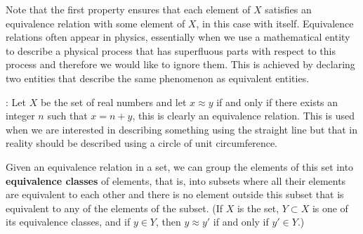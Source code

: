 {{Note that the first property ensures that each element of $X$
satisfies an equivalence relation with some element of $X$, in
this case with itself. Equivalence relations often appear in physics,
essentially when we use a mathematical entity to describe a physical
process that has superfluous parts with respect to this process and
therefore we would like to ignore them.
This is achieved by declaring two entities that describe the same phenomenon
as equivalent entities.

\ejem: Let $X$ be the set of real numbers and let $x \approx y$
if and only if there exists an integer $n$ such that $x = n + y$, this
is clearly an equivalence relation. This is used when 
we are interested in describing something using the straight line but that in
reality should be described using a circle of unit circumference.


Given an equivalence relation in a set, we can group the
elements of this set into {\bf equivalence classes} of elements, that is,
into subsets where all their elements are equivalent to each other
and there is no element outside this subset that is
equivalent to any of the elements of the subset.
(If $X$ is the set, $Y \subset X$ is one of its equivalence classes,
and if $y \in Y$, then $y \approx y'$ if and only if $y' \in Y$.)

}
}

